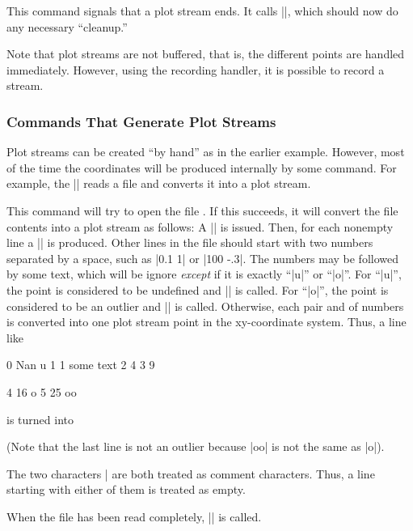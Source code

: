 \begin{command}{\pgfplotstreamend}
  This command signals that a plot stream ends. It calls
  |\pgf@plotstreamend|, which should now do any necessary ``cleanup.'' 
\end{command}

Note that plot streams are not buffered, that is, the different points
are handled immediately. However, using the recording handler, it is
possible to record a stream.


\subsubsection{Commands That Generate Plot Streams}
\label{section-plot-jumps}

Plot streams can be created ``by hand'' as in the earlier
example. However, most of the time the coordinates will be produced
internally by some command. For example, the |\pgfplotxyfile| reads a
file and converts it into a plot stream.

\begin{command}{\pgfplotxyfile{}}
  This command will try to open the file . If this
  succeeds, it will convert the file contents into a plot stream as
  follows: A |\pgfplotstreamstart| is issued. Then, for each nonempty
  line a |\pgfplotstreamnewdataset| is produced. Other lines in the
  file should start with two numbers separated by a space, such as
  |0.1 1| or |100 -.3|. The numbers may be followed by some text,
  which will be ignore \emph{except} if it is exactly ``|u|'' or
  ``|o|''. For ``|u|'', the point is considered to be undefined and
  |\pgfplotstreampointundefined| is called. For ``|o|'', the point is
  considered to be an outlier and |\pgfplotstreampointoutlier| is
  called. Otherwise, each pair  and  of numbers is
  converted into one  plot stream point in the xy-coordinate
  system. Thus, a line like 
\begin{codeexample}
0 Nan u  
1 1 some text
2 4
3 9

4 16 o
5 25 oo
\end{codeexample}
  is turned into
\begin{codeexample}
\pgfplotstreamstart
\pgfplotstreampointundefined
{}
\pgfplotstreamnewdataset
{}
\pgfplotstreamend
\end{codeexample}
  (Note that the last line is not an outlier because |oo| is not the
  same as |o|).

  The two characters |%
  are both treated as comment characters. Thus, a line starting with
  either of them is treated as empty.

  When the file has been read completely, |\pgfplotstreamend| is
  called.
\end{command}


